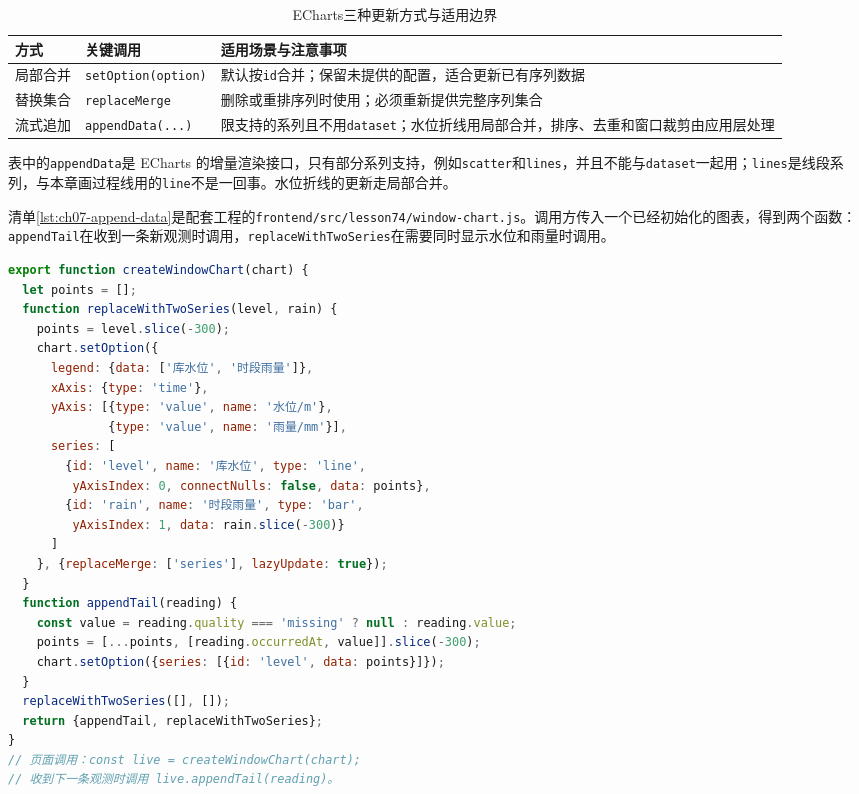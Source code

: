\begin{table}[htbp]
\centering
\caption{ECharts三种更新方式与适用边界}
\label{tab:ch07-echarts-update}
\begin{tabular}{p{3.0cm}p{4.2cm}p{5.0cm}}
\toprule
方式 & 关键调用 & 适用场景与注意事项 \\
\midrule
局部合并 & \texttt{setOption(option)} & 默认按\texttt{id}合并；保留未提供的配置，适合更新已有序列数据 \\
替换集合 & \texttt{replaceMerge} & 删除或重排序列时使用；必须重新提供完整序列集合 \\
流式追加 & \texttt{appendData(...)} & 限支持的系列且不用\texttt{dataset}；水位折线用局部合并，排序、去重和窗口裁剪由应用层处理 \\
\bottomrule
\end{tabular}
\end{table}

表中的\texttt{appendData}是 ECharts 的增量渲染接口，只有部分系列支持，例如\texttt{scatter}和\texttt{lines}，并且不能与\texttt{dataset}一起用；\texttt{lines}是线段系列，与本章画过程线用的\texttt{line}不是一回事\cite{apacheECharts}。水位折线的更新走局部合并。

清单\ref{lst:ch07-append-data}是配套工程的\texttt{frontend/src/lesson74/window-chart.js}。调用方传入一个已经初始化的图表，得到两个函数：\texttt{appendTail}在收到一条新观测时调用，\texttt{replaceWithTwoSeries}在需要同时显示水位和雨量时调用。

\begin{lstlisting}[label={lst:ch07-append-data},language=JavaScript,breaklines=true,caption={水位折线的尾部更新与序列切换}]
export function createWindowChart(chart) {
  let points = [];
  function replaceWithTwoSeries(level, rain) {
    points = level.slice(-300);
    chart.setOption({
      legend: {data: ['库水位', '时段雨量']},
      xAxis: {type: 'time'},
      yAxis: [{type: 'value', name: '水位/m'},
              {type: 'value', name: '雨量/mm'}],
      series: [
        {id: 'level', name: '库水位', type: 'line',
         yAxisIndex: 0, connectNulls: false, data: points},
        {id: 'rain', name: '时段雨量', type: 'bar',
         yAxisIndex: 1, data: rain.slice(-300)}
      ]
    }, {replaceMerge: ['series'], lazyUpdate: true});
  }
  function appendTail(reading) {
    const value = reading.quality === 'missing' ? null : reading.value;
    points = [...points, [reading.occurredAt, value]].slice(-300);
    chart.setOption({series: [{id: 'level', data: points}]});
  }
  replaceWithTwoSeries([], []);
  return {appendTail, replaceWithTwoSeries};
}
// 页面调用：const live = createWindowChart(chart);
// 收到下一条观测时调用 live.appendTail(reading)。
\end{lstlisting}

